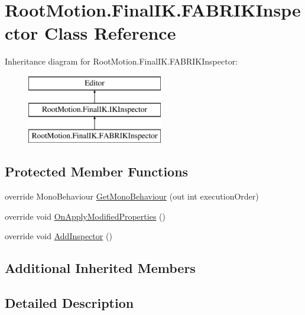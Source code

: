 \hypertarget{class_root_motion_1_1_final_i_k_1_1_f_a_b_r_i_k_inspector}{}\section{Root\+Motion.\+Final\+I\+K.\+F\+A\+B\+R\+I\+K\+Inspector Class Reference}
\label{class_root_motion_1_1_final_i_k_1_1_f_a_b_r_i_k_inspector}
Inheritance diagram for Root\+Motion.\+Final\+I\+K.\+F\+A\+B\+R\+I\+K\+Inspector\+:\begin{figure}[H]
\begin{center}
\leavevmode
\includegraphics[height=3.000000cm]{class_root_motion_1_1_final_i_k_1_1_f_a_b_r_i_k_inspector}
\end{center}
\end{figure}
\subsection*{Protected Member Functions}
\begin{DoxyCompactItemize}
\item 
override Mono\+Behaviour \mbox{\hyperlink{class_root_motion_1_1_final_i_k_1_1_f_a_b_r_i_k_inspector_ab4f6ad50b690754771819f879a728646}{Get\+Mono\+Behaviour}} (out int execution\+Order)
\item 
override void \mbox{\hyperlink{class_root_motion_1_1_final_i_k_1_1_f_a_b_r_i_k_inspector_a6a86f10a812820a3857c7d9a0c21a1b9}{On\+Apply\+Modified\+Properties}} ()
\item 
override void \mbox{\hyperlink{class_root_motion_1_1_final_i_k_1_1_f_a_b_r_i_k_inspector_a5c0631e80477937b171baee777b628b9}{Add\+Inspector}} ()
\end{DoxyCompactItemize}
\subsection*{Additional Inherited Members}


\subsection{Detailed Description}


